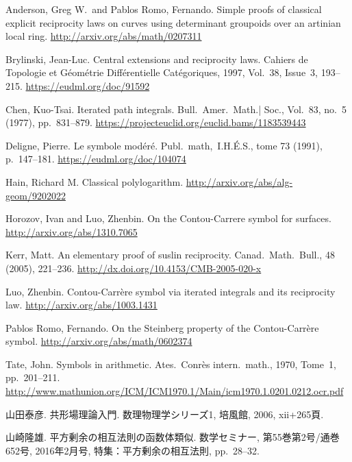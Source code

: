 \documentclass[12pt,twoside]{jarticle}
\theoremstyle{definition} %
\theoremstyle{definition} %
\theoremstyle{definition} %
\numberwithin{theorem}{section}
\numberwithin{equation}{section}
\numberwithin{figure}{section}
\numberwithin{table}{section}
\begin{document}
\begin{thebibliography}{99}

Anderson, Greg W.\ and Pablos Romo, Fernando.
Simple proofs of classical explicit reciprocity laws on curves
using determinant groupoids over an artinian local ring.
\href{http://arxiv.org/abs/math/0207311}
{http://arxiv.org/abs/math/0207311}

Brylinski, Jean-Luc.
Central extensions and reciprocity laws.
Cahiers de Topologie et G\'eom\'etrie Diff\'erentielle Cat\'egoriques,
1997, Vol.~38, Issue~3, 193--215.
\href{https://eudml.org/doc/91592}
{https://eudml.org/doc/91592}

Chen, Kuo-Tsai.
Iterated path integrals.
Bull.\ Amer.\ Math.| Soc.,
Vol.~83, no.~5 (1977), pp.~831--879.
\href{https://projecteuclid.org/euclid.bams/1183539443}
{https://projecteuclid.org/euclid.bams/1183539443}

Deligne, Pierre.
Le symbole mod\'er\'e.
Publ.\ math,\ I.H.\'E.S., tome 73 (1991), p.~147--181.
\href{https://eudml.org/doc/104074}
{https://eudml.org/doc/104074}

Hain, Richard M.
Classical polylogarithm.
\href{http://arxiv.org/abs/alg-geom/9202022}
{http://arxiv.org/abs/alg-geom/9202022}

Horozov, Ivan and Luo, Zhenbin.
On the Contou-Carrere symbol for surfaces.
\href{http://arxiv.org/abs/1310.7065}
{http://arxiv.org/abs/1310.7065}

Kerr, Matt.
An elementary proof of suslin reciprocity.
Canad.\ Math.\ Bull., 48 (2005), 221--236.
\href{ http://dx.doi.org/10.4153/CMB-2005-020-x}
{http://dx.doi.org/10.4153/CMB-2005-020-x}

Luo, Zhenbin.
Contou-Carr\`ere symbol via iterated integrals and its reciprocity law.
\href{http://arxiv.org/abs/1003.1431}
{http://arxiv.org/abs/1003.1431}

Pablos Romo, Fernando.
On the Steinberg property of the Contou-Carr\`ere symbol.
\href{http://arxiv.org/abs/math/0602374}
{http://arxiv.org/abs/math/0602374}

Tate, John.
Symbols in arithmetic.
Ates.\ Conr\`es intern.\ math., 1970, Tome~1, pp.~201--211.
\href{http://www.mathunion.org/ICM/ICM1970.1/Main/icm1970.1.0201.0212.ocr.pdf}
{http://www.mathunion.org/ICM/ICM1970.1/Main/icm1970.1.0201.0212.ocr.pdf}

山田泰彦.
共形場理論入門.
数理物理学シリーズ1, 培風館, 2006, xii+265頁.

山崎隆雄.
平方剰余の相互法則の函数体類似.
数学セミナー, 第55巻第2号/通巻652号,
2016年2月号,
特集：平方剰余の相互法則,
pp.~28--32.

\end{thebibliography}



\end{document}
